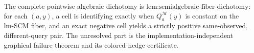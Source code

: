 The complete pointwise algebraic dichotomy is \(\text{lem:semialgebraic-fiber-dichotomy}\): for each \((a,y)\), a cell is identifying exactly when \(Q_a^{\mathcal M}(y)\) is constant on the lm-SCM fiber, and an exact negative cell yields a strictly positive same-observed, different-query pair. The unresolved part is the implementation-independent graphical failure theorem and its colored-hedge certificate.